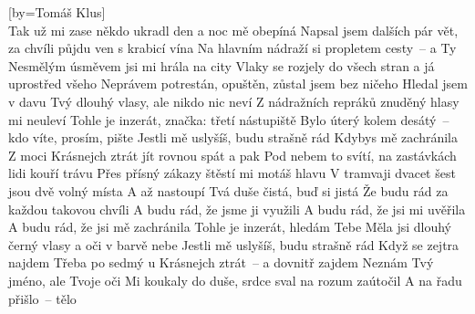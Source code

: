 [by={Tomáš Klus}]
\emptyv
\cseq{\[G] \[D] \[Em] \[C]}\\
\cl
\chordsoff
\freev
Tak už mi zase někdo ukradl den a noc mě obepíná
Napsal jsem dalších pár vět, za chvíli půjdu ven s krabicí vína
Na hlavním nádraží si propletem cesty~-- a Ty
Nesmělým úsměvem jsi mi hrála na city
\cl
\freev
Vlaky se rozjely do všech stran a já uprostřed všeho
Neprávem potrestán, opuštěn, zůstal jsem bez ničeho
Hledal jsem v davu Tvý dlouhý vlasy, ale nikdo nic neví
Z nádražních repráků znuděný hlasy mi neuleví
\cl
\chor
Tohle je inzerát, značka: třetí nástupiště
Bylo úterý kolem desátý~-- kdo víte, prosím, pište
Jestli mě uslyšíš, budu strašně rád
Kdybys mě zachránila
Z moci Krásnejch ztrát jít rovnou spát a pak
\cl
\freev
Pod nebem to svítí, na zastávkách lidi kouří trávu
Přes přísný zákazy štěstí mi motáš hlavu
V tramvaji dvacet šest jsou dvě volný místa
A až nastoupí Tvá duše čistá, buď si jistá
Že budu rád za každou takovou chvíli
A budu rád, že jsme ji využili
A budu rád, že jsi mi uvěřila
A budu rád, že jsi mě zachránila
\cl
\chor
Tohle je inzerát, hledám Tebe
Měla jsi dlouhý černý vlasy a oči v barvě nebe
Jestli mě uslyšíš, budu strašně rád
Když se zejtra najdem
Třeba po sedmý u Krásnejch ztrát~-- a dovnitř zajdem
\cl
\bridge
Neznám Tvý jméno, ale Tvoje oči
Mi koukaly do duše, srdce sval na rozum zaútočil
A na řadu přišlo~-- tělo
\cl
\endsong




